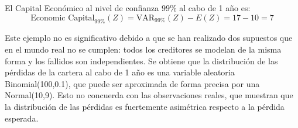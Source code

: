 El Capital Econ\'omico al nivel de confianza $99\%$ al cabo de 1 a\~no es:
\begin{displaymath}
\textrm{Economic Capital}_{99\%}(Z) = \textrm{VAR}_{99\%}(Z) - E(Z) = 17 - 10 = 7
\end{displaymath}

Este ejemplo no es significativo debido a que se han realizado dos supuestos
que en el mundo real no se cumplen: todos los creditores se modelan de la misma 
forma y los fallidos son independientes. Se obtiene que la distribuci\'on de las 
p\'erdidas de la cartera al cabo de 1 a\~no es una variable aleatoria Binomial(100,0.1),
que puede ser aproximada de forma precisa por una Normal(10,9). Esto no concuerda
con las observaciones reales, que muestran que la distribuci\'on de las p\'erdidas
es fuertemente asim\'etrica respecto a la p\'erdida esperada.


